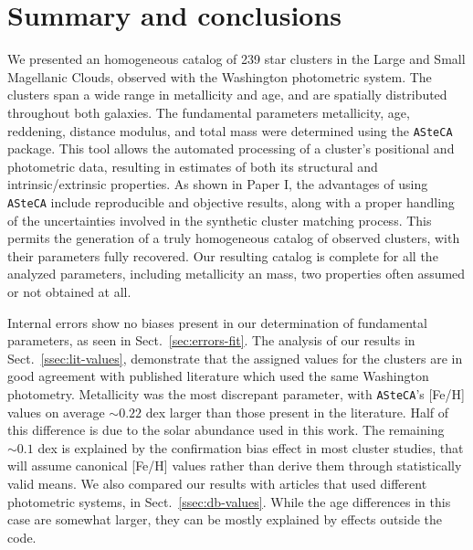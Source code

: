 \documentclass[referee]{aa}
\begin{document}

\section{Summary and conclusions}
\label{sec:summ-concl}

We presented an homogeneous catalog of 239 star clusters in the Large and Small
Magellanic Clouds, observed with the Washington photometric system. The clusters
span a wide range in metallicity and age, and are spatially distributed
throughout both galaxies.
%
The fundamental parameters metallicity, age, reddening, distance modulus, and
total mass were determined using the \texttt{ASteCA} package.
%
This tool allows the automated processing of a cluster's positional and
photometric data, resulting in estimates of both its structural and
intrinsic/extrinsic properties.
%
As shown in Paper I, the advantages of using \texttt{ASteCA} include
reproducible and objective results, along with a proper handling of the
uncertainties involved in the synthetic cluster matching process.
%
This permits the generation of a truly homogeneous catalog of observed
clusters, with their parameters fully recovered.
%
Our resulting catalog is complete for all the analyzed parameters, including
metallicity an mass, two properties often assumed or not obtained at all.

Internal errors show no biases present in our determination of fundamental
parameters, as seen in Sect.~\ref{sec:errors-fit}.
%
The analysis of our results in Sect.~\ref{ssec:lit-values}, demonstrate that the
assigned values for the clusters are in good agreement with published literature
which used the same Washington photometry.
%
Metallicity was the most discrepant parameter, with \texttt{ASteCA}'s
[Fe/H] values on average ${\sim}0.22$ dex larger than those present in the
literature. Half of this difference is due to the solar abundance used in
this work. The remaining ${\sim}0.1$ dex is explained by the confirmation
bias effect in most cluster studies, that will assume canonical [Fe/H]
values rather than derive them through statistically valid means.
%
We also compared our results with articles that used different photometric
systems, in Sect.~\ref{ssec:db-values}. While the age differences in
this case are somewhat larger, they can be mostly explained by effects outside
the code.
\end{document}
